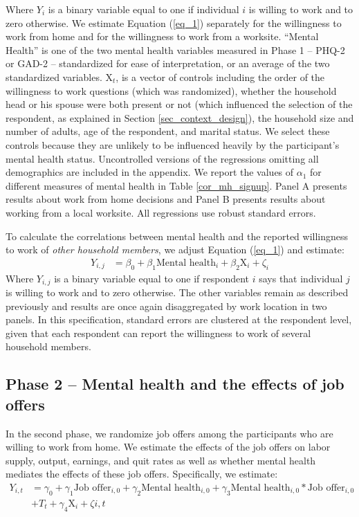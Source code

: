 \documentclass[12pt, a4paper, american]{article}
\begin{document}
Where $Y_{i}$ is a binary variable equal to one if individual $i$ is willing to work and to zero otherwise.  We estimate Equation (\ref{eq_1}) separately for the willingness to work from home and for the willingness to work from a worksite. ``Mental Health'' is one of the two mental health variables measured in Phase 1 -- PHQ-2 or GAD-2 -- standardized for ease of interpretation, or an average of the two standardized variables. $\text{X}_t$, is a vector of controls including the order of the willingness to work questions (which was randomized), whether the household head or his spouse were both present or not (which influenced the selection of the respondent, as explained in Section \ref{sec_context_design}), the household size and number of adults, age of the respondent, and marital status. We select these controls because they are unlikely to be influenced heavily by the participant's mental health status. Uncontrolled versions of the regressions omitting all demographics are included in the appendix. We report the values of $\alpha_1$ for different measures of mental health in Table \ref{cor_mh_signup}. Panel A presents results about work from home decisions and Panel B presents results about working from a local worksite. All regressions use robust standard errors. 

To calculate the correlations between mental health and the reported willingness to work of \textit{other household members}, we adjust Equation (\ref{eq_1}) and estimate: 
\begin{equation}\label{eq_1_others}
\begin{aligned}
Y_{i,j} &= \beta_0 + \beta_1  \text{Mental health}_{i}  + \beta_2 \text{X}_{i} + \zeta_{i}
\end{aligned}
\end{equation}
Where $Y_{i,j}$ is a binary variable equal to one if respondent $i$ says that individual $j$ is willing to work and to zero otherwise. The other variables remain as described previously and results are once again disaggregated by work location in two panels. In this specification, standard errors are clustered at the respondent level, given that each respondent can report the willingness to work of several household members.

\subsection{Phase 2 -- Mental health and the effects of job offers}
In the second phase, we randomize job offers among the participants who are willing to work from home. We estimate the effects of the job offers on labor supply, output, earnings, and quit rates as well as whether mental health mediates the effects of these job offers. Specifically, we estimate:
\begin{equation}\label{eq_2}
\begin{aligned}
Y_{i,t} &= \gamma_0 + \gamma_1 \text{Job offer}_{i,0} + \gamma_2 \text{Mental health}_{i,0}  + \gamma_3 \text{Mental health}_{i,0}*\text{Job offer}_{i,0}    \\
& + T_t + \gamma_4 \text{X}_{i} + \zeta{i,t}
\end{aligned}
\end{equation}
\end{document}
